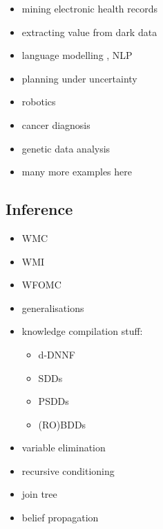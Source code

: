 \documentclass{article}
\begin{document}
\begin{itemize}
\item mining electronic health records \cite{DBLP:conf/iaai/NatarajanKIJC13}
\item extracting value from dark data
  \cite{DBLP:journals/ijswis/NiuZRS12,DBLP:conf/emnlp/VenugopalCGN14}
\item language modelling \cite{DBLP:conf/icml/JerniteRS15}, NLP
  \cite{DBLP:conf/ijcai/DriesKDBR17}
\item planning under uncertainty \cite{DBLP:journals/jair/BoutilierDH99}
\item robotics \cite{DBLP:journals/ras/BeetzJMT10,DBLP:conf/icra/MoldovanMOSR12}
\item cancer diagnosis \cite{DBLP:conf/ilp/Corte-RealD017}
\item genetic data analysis \cite{DBLP:journals/nar/MaeyerWRRM15}
\item many more examples here \cite{DBLP:series/synthesis/2016Raedt}
\end{itemize}

\subsection{Inference}

\begin{itemize}
\item WMC \cite{DBLP:journals/ai/ChaviraD08}
\item WMI \cite{DBLP:conf/ijcai/BellePB15}
\item WFOMC \cite{DBLP:conf/ijcai/BroeckTMDR11,DBLP:journals/cacm/GogateD16}
\item generalisations
  \cite{DBLP:journals/ijar/BelleR20,DBLP:journals/jair/BacchusDP09,DBLP:journals/japll/KimmigBR17}
\item knowledge compilation stuff:
  \begin{itemize}
  \item d-DNNF \cite{DBLP:journals/jancl/Darwiche01}
  \item SDDs \cite{DBLP:conf/ijcai/Darwiche11}
  \item PSDDs \cite{DBLP:conf/kr/KisaBCD14}
  \item (RO)BDDs \cite{DBLP:journals/tc/Bryant86}
  \end{itemize}
\item variable elimination \cite{DBLP:journals/ai/Dechter99}
\item recursive conditioning \cite{DBLP:journals/ai/Darwiche01}
\item join tree \cite{lauritzen1988local}
\item belief propagation \cite{DBLP:conf/aaai/Pearl82}
\end{itemize}
\end{document}
